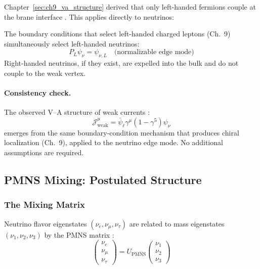 Chapter~\ref{sec:ch9_va_structure} derived that only left-handed fermions couple
at the brane interface \tagDc{}. This applies directly to neutrinos:

\begin{corollary}
\label{cor:ch6_left_nu}
The boundary conditions that select left-handed charged leptons (Ch.~9)
simultaneously select left-handed neutrinos:
\begin{equation}
    P_L \psi_\nu = \psi_{\nu,L} \quad \text{(normalizable edge mode)}
\end{equation}
Right-handed neutrinos, if they exist, are expelled into the bulk and do not
couple to the weak vertex.
\end{corollary}

\paragraph{Consistency check.}
The observed V--A structure of weak currents \tagBL{}:
\begin{equation}
    \mathcal{J}^\mu_{\text{weak}} = \bar\psi_\ell \gamma^\mu (1 - \gamma^5) \psi_\nu
\end{equation}
emerges from the same boundary-condition mechanism that produces chiral
localization (Ch.~9), applied to the neutrino edge mode. No additional
assumptions are required.

\subsection{PMNS Mixing: Postulated Structure}
\label{sec:ch6_pmns}

\subsubsection{The Mixing Matrix}

Neutrino flavor eigenstates $(\nu_e, \nu_\mu, \nu_\tau)$ are related to
mass eigenstates $(\nu_1, \nu_2, \nu_3)$ by the PMNS matrix \tagBL{}:
\begin{equation}
    \begin{pmatrix} \nu_e \\ \nu_\mu \\ \nu_\tau \end{pmatrix}
    = U_{\text{PMNS}}
    \begin{pmatrix} \nu_1 \\ \nu_2 \\ \nu_3 \end{pmatrix}
    \label{eq:ch6_pmns}
\end{equation}


